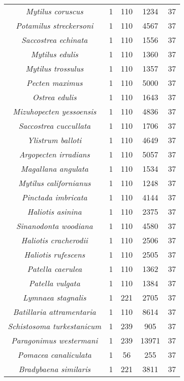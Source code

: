 \begin{longtable}[c]{|c|c|c|c|c|}
\textit{Mytilus coruscus}          & 1  & 110 & 1234  & 37 \\
\textit{Potamilus streckersoni}    & 1  & 110 & 4567  & 37 \\
\textit{Saccostrea echinata}       & 1  & 110 & 1556  & 37 \\
\textit{Mytilus edulis}            & 1  & 110 & 1360  & 37 \\
\textit{Mytilus trossulus}         & 1  & 110 & 1357  & 37 \\
\textit{Pecten maximus}            & 1  & 110 & 5000  & 37 \\
\textit{Ostrea edulis}             & 1  & 110 & 1643  & 37 \\
\textit{Mizuhopecten yessoensis}   & 1  & 110 & 4836  & 37 \\
\textit{Saccostrea cuccullata}     & 1  & 110 & 1706  & 37 \\
\textit{Ylistrum balloti}          & 1  & 110 & 4649  & 37 \\
\textit{Argopecten irradians}      & 1  & 110 & 5057  & 37 \\
\textit{Magallana angulata}        & 1  & 110 & 1534  & 37 \\
\textit{Mytilus californianus}     & 1  & 110 & 1248  & 37 \\
\textit{Pinctada imbricata}        & 1  & 110 & 4144  & 37 \\
\textit{Haliotis asinina}          & 1  & 110 & 2375  & 37 \\
\textit{Sinanodonta woodiana}      & 1  & 110 & 4580  & 37 \\
\textit{Haliotis cracherodii}      & 1  & 110 & 2506  & 37 \\
\textit{Haliotis rufescens}        & 1  & 110 & 2505  & 37 \\
\textit{Patella caerulea}          & 1  & 110 & 1362  & 37 \\
\textit{Patella vulgata}           & 1  & 110 & 1384  & 37 \\
\textit{Lymnaea stagnalis}         & 1  & 221 & 2705  & 37 \\
\textit{Batillaria attramentaria}  & 1  & 110 & 8614  & 37 \\
\textit{Schistosoma turkestanicum} & 1  & 239 & 905   & 37 \\
\textit{Paragonimus westermani}    & 1  & 239 & 13971 & 37 \\
\textit{Pomacea canaliculata}      & 1  & 56  & 255   & 37 \\
\textit{Bradybaena similaris}      & 1  & 221 & 3811  & 37 \\

\end{longtable}
